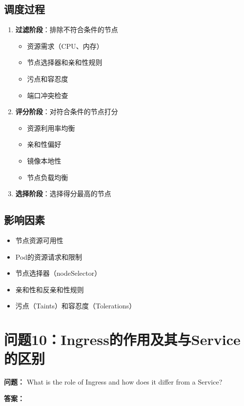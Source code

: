 \documentclass[12pt,a4paper]{article}
\begin{document}
\subsection{调度过程}
\begin{enumerate}
    \item \textbf{过滤阶段}：排除不符合条件的节点
    \begin{itemize}
        \item 资源需求（CPU、内存）
        \item 节点选择器和亲和性规则
        \item 污点和容忍度
        \item 端口冲突检查
    \end{itemize}
    
    \item \textbf{评分阶段}：对符合条件的节点打分
    \begin{itemize}
        \item 资源利用率均衡
        \item 亲和性偏好
        \item 镜像本地性
        \item 节点负载均衡
    \end{itemize}
    
    \item \textbf{选择阶段}：选择得分最高的节点
\end{enumerate}

\subsection{影响因素}
\begin{itemize}
    \item 节点资源可用性
    \item Pod的资源请求和限制
    \item 节点选择器（nodeSelector）
    \item 亲和性和反亲和性规则
    \item 污点（Taints）和容忍度（Tolerations）
\end{itemize}

\section{问题10：Ingress的作用及其与Service的区别}

\textbf{问题：} What is the role of Ingress and how does it differ from a Service?

\textbf{答案：}
\end{document}
